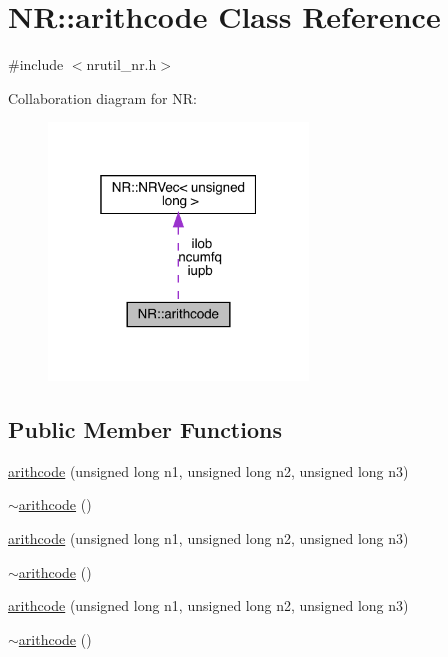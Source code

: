 \hypertarget{classNR_1_1arithcode}{}\section{NR\+:\+:arithcode Class Reference}
\label{classNR_1_1arithcode}


{\ttfamily \#include $<$nrutil\+\_\+nr.\+h$>$}



Collaboration diagram for NR\+:\nopagebreak
\begin{figure}[H]
\begin{center}
\leavevmode
\includegraphics[width=196pt]{dc/d66/classNR_1_1arithcode__coll__graph}
\end{center}
\end{figure}
\subsection*{Public Member Functions}
\begin{DoxyCompactItemize}
\item 
\mbox{\hyperlink{classNR_1_1arithcode_a796f8507b3d8ca8262843905ea6712ec}{arithcode}} (unsigned long n1, unsigned long n2, unsigned long n3)
\item 
\mbox{\hyperlink{classNR_1_1arithcode_a79953c7e7e1ac195e20884e7498cccae}{$\sim$arithcode}} ()
\item 
\mbox{\hyperlink{classNR_1_1arithcode_a796f8507b3d8ca8262843905ea6712ec}{arithcode}} (unsigned long n1, unsigned long n2, unsigned long n3)
\item 
\mbox{\hyperlink{classNR_1_1arithcode_a79953c7e7e1ac195e20884e7498cccae}{$\sim$arithcode}} ()
\item 
\mbox{\hyperlink{classNR_1_1arithcode_a796f8507b3d8ca8262843905ea6712ec}{arithcode}} (unsigned long n1, unsigned long n2, unsigned long n3)
\item 
\mbox{\hyperlink{classNR_1_1arithcode_a79953c7e7e1ac195e20884e7498cccae}{$\sim$arithcode}} ()
\end{DoxyCompactItemize}
